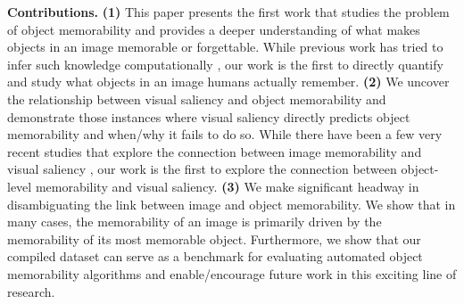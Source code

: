 \vspace{3pt}\noindent\textbf{Contributions.} \textbf{(1)} This paper presents the first work that studies the problem of object memorability and provides a deeper understanding of what makes objects in an image memorable or forgettable. While previous work has tried to infer such knowledge  computationally \cite{khosla12}, our work is the first to directly quantify and study what objects in an image humans actually remember.  \textbf{(2)} We uncover the relationship between visual saliency and object memorability and demonstrate those instances where visual saliency directly predicts object memorability and when/why it fails to do so. While there have been a few very recent studies that explore the connection between image memorability and visual saliency \cite{zoya15,lemeur13,kim13}, our work is the first to explore the connection between object-level memorability and visual saliency. %
\textbf{(3)} We make significant headway in disambiguating the link between image and object memorability. We show that in many cases, the memorability of an image is primarily driven by the memorability of its most memorable object. %
Furthermore, we show that our compiled dataset can serve as a benchmark for evaluating automated object memorability algorithms and enable/encourage future work in this exciting line of research.%
